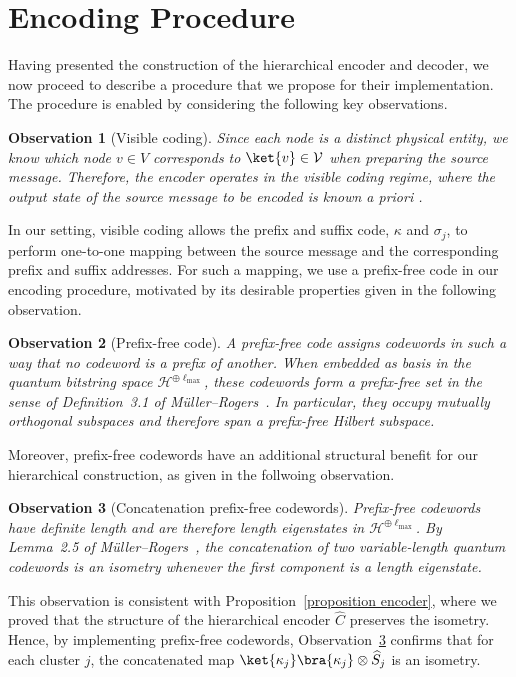 \documentclass[conference]{IEEEtran}
\newtheorem{observation}{Observation}
\begin{document}
 \section{Encoding Procedure} \label{Section encoding procedure}
Having presented the construction of the hierarchical encoder and decoder, we now proceed to describe a procedure that we propose for their implementation. The procedure is enabled by considering the following key observations.
\begin{observation}[Visible coding]\label{observation visible coding}
Since each node is a distinct physical entity, we know which node $v\in V$ corresponds to $\ket{v}\in\mathcal{V}$ when preparing the source message. Therefore, the encoder operates in the visible coding regime, where the output state of the source message to be encoded is known a priori \cite{HowardBarnum_2001, PhysRevA.65.032313}.
\end{observation}
In our setting, visible coding allows the prefix and suffix code, $\kappa$ and $\sigma_j$, to perform one-to-one mapping between the source message and the corresponding prefix and suffix addresses. For such a mapping, we use a prefix-free code in our encoding procedure, motivated by its desirable properties given in the following observation.
\begin{observation}[Prefix-free code]\label{observation prefix free}
A prefix-free code assigns codewords in such a way that no codeword is a prefix of another. When embedded as basis in the quantum bitstring space $\mathcal{H}^{\oplus \ell_{\mathrm{max}}}$, these codewords form a prefix-free set in the sense of Definition~3.1 of
Müller--Rogers~\cite{Mller2008QuantumBS}. In particular, they occupy mutually orthogonal subspaces and therefore span a prefix-free Hilbert subspace.
\end{observation}
Moreover, prefix-free codewords have an additional structural benefit for our hierarchical
construction, as given in the follwoing observation.
\begin{observation}[Concatenation prefix-free codewords]\label{observation concatenation}
Prefix-free codewords have definite length and are therefore length eigenstates
in $\mathcal{H}^{\oplus \ell_{\mathrm{max}}}$. By Lemma~2.5 of
Müller--Rogers~\cite{Mller2008QuantumBS}, the concatenation of two
variable-length quantum codewords is an isometry whenever the first component
is a length eigenstate.
\end{observation} 
This observation is consistent with Proposition~\ref{proposition encoder}, where we proved that the structure of the hierarchical encoder $\widehat{C}$ preserves the isometry. Hence, by implementing prefix-free codewords, Observation~\ref{observation concatenation} confirms that for each cluster $j$, the concatenated map $\ket{\kappa_j}\bra{\kappa_j}\otimes \widehat{S}_j$ is an isometry.
\end{document}
